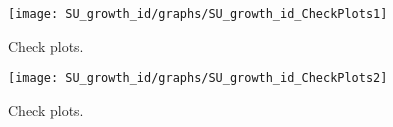 
\begin{figure}[H]
\centering 
\texttt{[image: SU\_growth\_id/graphs/SU\_growth\_id\_CheckPlots1]}
\caption{Check plots.}\label{Fig:CheckPlots:1}
\end{figure}
 
\begin{figure}[H]
\centering 
\texttt{[image: SU\_growth\_id/graphs/SU\_growth\_id\_CheckPlots2]}
\caption{Check plots.}\label{Fig:CheckPlots:2}
\end{figure}
 
